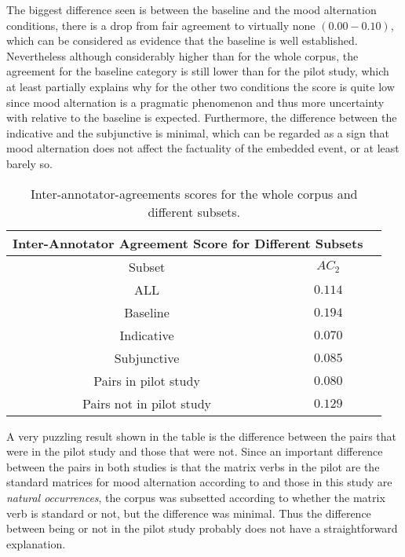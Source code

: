 The biggest difference seen is between the baseline and the mood alternation conditions, there is a drop from fair agreement to virtually none $(0.00-0.10)$, which can be considered as evidence that the baseline is well established. Nevertheless although considerably higher than for the whole corpus, the agreement for the baseline category is still lower than for the pilot study, which at least partially explains why for the other two conditions the score is quite low since mood alternation is a pragmatic phenomenon and thus more uncertainty with relative to the baseline is expected. Furthermore, the difference between the indicative and the subjunctive is minimal, which can be regarded as a sign that mood alternation does not affect the factuality of the embedded event, or at least barely so.\\

\begin{table}
\center
\begin{tabular}{|c|c|c|}
\hline
\multicolumn{2}{|c|}{Inter-Annotator Agreement Score for Different Subsets}\\\hline
                     Subset & $AC_2$\\\hline 
ALL & $0.114$\\\hline 
Baseline & $0.194$\\\hline
Indicative & $0.070$ \\\hline
Subjunctive & $ 0.085$\\\hline
Pairs in pilot study & $0.080$ \\\hline
Pairs not in pilot study & $ 0.129$\\\hline
\end{tabular}
\caption[Ac2 subsets.]{Inter-annotator-agreements scores for the whole corpus and different subsets.}
\label{tab:iaa}
\end{table}

A very puzzling result shown in the table is the difference between the pairs that were in the pilot study and those that were not. Since an important difference between the pairs in both studies is that the matrix verbs in the pilot are the standard matrices for mood alternation according to \citet{espanola2010nueva} and those in this study are \textit{natural occurrences}, the corpus was subsetted according to whether the matrix verb is standard or not, but the difference was minimal. Thus the difference between being or not in the pilot study probably does not have a straightforward explanation.\\


